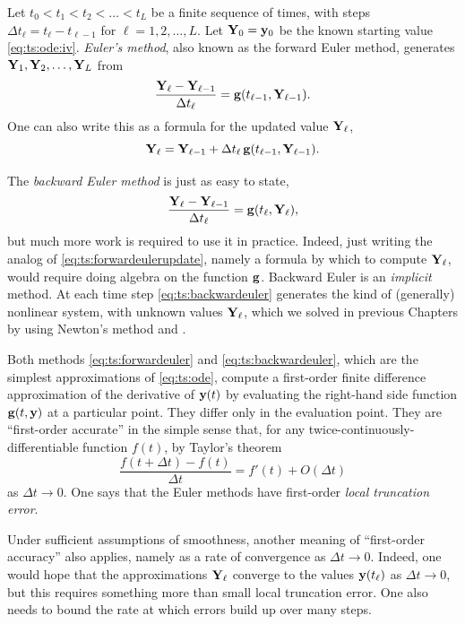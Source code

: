 Let $t_0<t_1<t_2<\dots<t_L$ be a finite sequence of times, with steps $\Delta t_\ell = t_\ell - t_{\ell-1}$ for $\ell=1,2,\dots,L$.  Let $\mathbf{Y}_0 = \mathbf{y}_0$ be the known starting value  \eqref{eq:ts:ode:iv}.  \emph{Euler's method}, also known as the forward Euler method, generates $\mathbf{Y}_1,\mathbf{Y}_2,\dots,\mathbf{Y}_L$ from
\begin{equation}
\frac{\mathbf{Y}_\ell - \mathbf{Y}_{\ell-1}}{\Delta t_\ell} = \mathbf{g}(t_{\ell-1},\mathbf{Y}_{\ell-1}). \label{eq:ts:forwardeuler}
\end{equation}
One can also write this as a formula for the updated value $\mathbf{Y}_\ell$,
\begin{equation}
\mathbf{Y}_\ell = \mathbf{Y}_{\ell-1} + \Delta t_\ell \, \mathbf{g}(t_{\ell-1},\mathbf{Y}_{\ell-1}). \label{eq:ts:forwardeulerupdate}
\end{equation}

The \emph{backward Euler method} is just as easy to state,
\begin{equation}
\frac{\mathbf{Y}_\ell - \mathbf{Y}_{\ell-1}}{\Delta t_\ell} = \mathbf{g}(t_{\ell},\mathbf{Y}_{\ell}),  \label{eq:ts:backwardeuler}
\end{equation}
but much more work is required to use it in practice.  Indeed, just writing the analog of \eqref{eq:ts:forwardeulerupdate}, namely a formula by which to compute $\mathbf{Y}_\ell$, would require doing algebra on the function $\mathbf{g}$.  Backward Euler is an \emph{implicit} method.  At each time step \eqref{eq:ts:backwardeuler} generates the kind of (generally) nonlinear system, with unknown values $\mathbf{Y}_\ell$, which we solved in previous Chapters by using Newton's method and \pSNES.

Both methods \eqref{eq:ts:forwardeuler} and \eqref{eq:ts:backwardeuler}, which are the simplest approximations of \eqref{eq:ts:ode}, compute a first-order finite difference approximation of the derivative of $\mathbf{y}(t)$ by evaluating the right-hand side function $\mathbf{g}(t,\mathbf{y})$ at a particular point.  They differ only in the evaluation point.  They are ``first-order accurate'' in the simple sense that, for any twice-continuously-differentiable function $f(t)$, by Taylor's theorem
    $$\frac{f(t+\Delta t) - f(t)}{\Delta t} = f'(t) + O(\Delta t)$$
as $\Delta t \to 0$.  One says that the Euler methods have first-order \emph{local truncation error}.

Under sufficient assumptions of smoothness, another meaning of ``first-order accuracy'' also applies, namely as a rate of convergence as $\Delta t\to 0$.  Indeed, one would hope that the approximations $\mathbf{Y}_\ell$ converge to the values $\mathbf{y}(t_\ell)$ as $\Delta t\to 0$, but this requires something more than small local truncation error.  One also needs to bound the rate at which errors build up over many steps.

